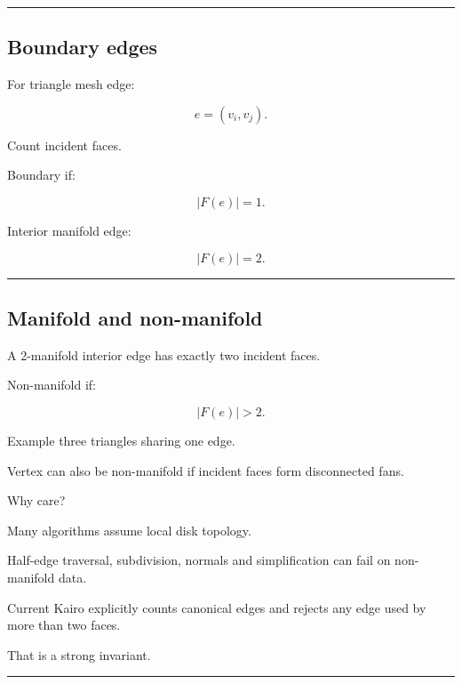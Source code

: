 \begin{center}\rule{0.5\linewidth}{0.5pt}\end{center}

\subsection{Boundary edges}\label{04-visual-computing-ii-ch041-boundary-edges}

\hypertarget{04-visual-computing-ii-ch041-boundary-edges}{}

For triangle mesh edge:

\[
e=(v_i,v_j).
\]

Count incident faces.

Boundary if:

\[
\boxed{
|F(e)|=1.
}
\]

Interior manifold edge:

\[
|F(e)|=2.
\]

\begin{center}\rule{0.5\linewidth}{0.5pt}\end{center}

\subsection{Manifold and non-manifold}\label{04-visual-computing-ii-ch041-manifold-and-non-manifold}

\hypertarget{04-visual-computing-ii-ch041-manifold-and-non-manifold}{}

A 2-manifold interior edge has exactly two incident faces.

Non-manifold if:

\[
|F(e)|>2.
\]

Example three triangles sharing one edge.

Vertex can also be non-manifold if incident faces form disconnected fans.

Why care?

Many algorithms assume local disk topology.

Half-edge traversal, subdivision, normals and simplification can fail on non-manifold data.

Current Kairo  explicitly counts canonical edges and rejects any edge used by more than two faces.

That is a strong invariant.

\begin{center}\rule{0.5\linewidth}{0.5pt}\end{center}

